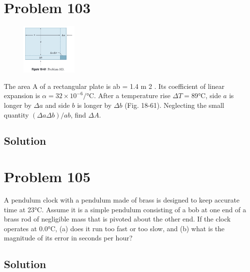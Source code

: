 \documentclass[12pt]{article}
\begin{document}
    \section{Problem 103}
        \begin{figure}
            \vspace{-30pt}
            \includegraphics[width=0.25\textwidth]{picture_18-61.png} 
        \end{figure}
        The area A of a rectangular plate is ab = 1.4 m 2 . 
        Its coefficient of linear expansion is $\alpha = 32 \times 10^{-6} /\unit{\celsius}$. 
        After a temperature rise $\Delta T = 89\unit{\celsius}$, side $a$ is longer by $\Delta a$ and side $b$ is longer by $\Delta b$ (Fig. 18-61). 
        Neglecting the small quantity $(\Delta a \Delta b)/ab$, find $\Delta A$. 

    \subsection{Solution}

    \pagebreak
    \section{Problem 105}
        A pendulum clock with a pendulum made of brass is designed to keep accurate time at 23°C. 
        Assume it is a simple pendulum consisting of a bob at one end of a brass rod of negligible mass that is pivoted about the other end. 
        If the clock operates at 0.0°C, (a) does it run too fast or too slow, and (b) what is the magnitude of its error in seconds per hour?

    \subsection{Solution}

    \pagebreak

    \tableofcontents
\end{document}
